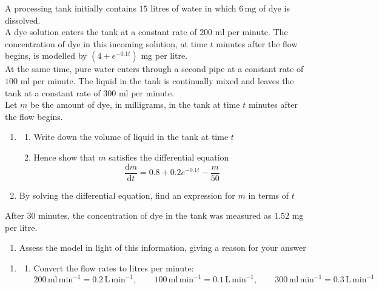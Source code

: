 \documentclass[leqno]{article}
\begin{document}
\begin{enumerate}[
  label=\textbf{\arabic*.},
  leftmargin=*,
  topsep=0pt,
  partopsep=0pt,
  parsep=0pt
]
\newpage

\questionitem

A processing tank initially contains $15$ litres of water in which $6\,\mathrm{mg}$ of dye is dissolved. \\

A dye solution enters the tank at a constant rate of $200$ ml per minute. The concentration of dye in this incoming solution, at time $t$ minutes after the flow begins, is modelled by $(4+e^{-0.1t})$ mg per litre. \\

At the same time, pure water enters through a second pipe at a constant rate of $100$ ml per minute. The liquid in the tank is continually mixed and leaves the tank at a constant rate of $300$ ml per minute. \\

Let $m$ be the amount of dye, in milligrams, in the tank at time $t$ minutes after the flow begins. \\
\begin{enumerate}[label=\textbf{(\alph*)}]
  \item 
  \begin{enumerate}[label=(\roman*)]
    \item Write down the volume of liquid in the tank at time $t$
    \item Hence show that $m$ satisfies the differential equation
    \[
    \frac{\mathrm{d}m}{\mathrm{d}t}=0.8+0.2e^{-0.1t}-\frac{m}{50}
    \]
  \end{enumerate}
  \item By solving the differential equation, find an expression for $m$ in terms of $t$  \\
\end{enumerate}
After $30$ minutes, the concentration of dye in the tank was measured as $1.52$ mg per litre. \\
\begin{enumerate}[label=\textbf{(\alph*)}, resume]
  \item Assess the model in light of this information, giving a reason for your answer  \\
\end{enumerate}

\vspace*{10pt}

\begin{djsSolution}
\begin{enumerate}[label=\textbf{(\alph*)}]
  \item
  \begin{enumerate}[label=(\roman*)]
    \item Convert the flow rates to litres per minute:
    \[
    200\,\mathrm{ml\,min}^{-1}=0.2\,\mathrm{L\,min}^{-1},\qquad 100\,\mathrm{ml\,min}^{-1}=0.1\,\mathrm{L\,min}^{-1},\qquad 300\,\mathrm{ml\,min}^{-1}=0.3\,\mathrm{L\,min}^{-1}
    \]


\end{enumerate}
\end{enumerate}
\end{djsSolution}
\end{enumerate}
\end{document}
